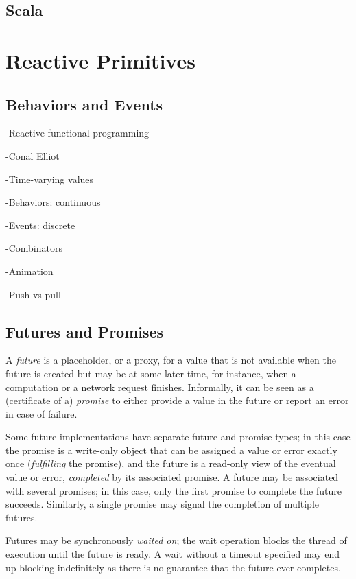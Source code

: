\subsection{Scala}

\section{Reactive Primitives}

\subsection{Behaviors and Events}

-Reactive functional programming

-Conal Elliot

-Time-varying values

-Behaviors: continuous

-Events: discrete 

-Combinators

-Animation

-Push vs pull

\subsection{Futures and Promises}

A \emph{future} is a placeholder, or a proxy, for a value that is not available when the future is created but may be at some later time, for instance, when a computation or a network request finishes. Informally, it can be seen as a (certificate of a) \emph{promise} to either provide a value in the future or report an error in case of failure.

Some future implementations have separate future and promise types; in this case the promise is a write-only object that can be assigned a value or error exactly once (\emph{fulfilling} the promise), and the future is a read-only view of the eventual value or error, \emph{completed} by its associated promise. A future may be associated with several promises; in this case, only the first promise to complete the future succeeds. Similarly, a single promise may signal the completion of multiple futures.

Futures may be synchronously \emph{waited on}; the wait operation blocks the thread of execution until the future is ready. A wait without a timeout specified may end up blocking indefinitely as there is no guarantee that the future ever completes.



